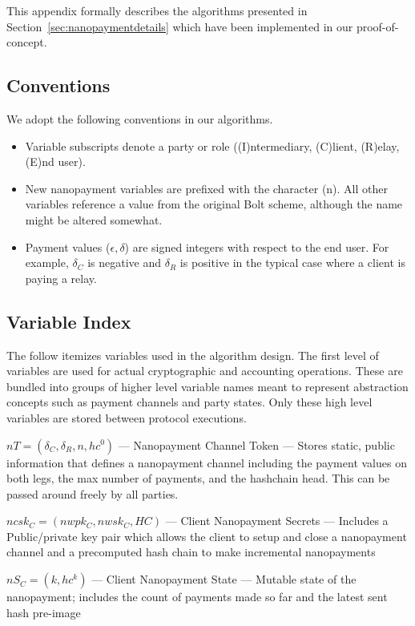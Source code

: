 This appendix formally describes the algorithms presented in Section~\ref{sec:nanopaymentdetails} which have been implemented in our proof-of-concept. 

\subsection{Conventions}

We adopt the following conventions in our algorithms.

\begin{itemize}
\item Variable subscripts denote a party or role ((I)ntermediary, (C)lient, (R)elay, (E)nd user).
\item New nanopayment variables are prefixed with the character (n).
  All other variables reference a value from the original Bolt scheme, although the name might be altered somewhat.
\item Payment values ($\epsilon, \delta$) are signed integers with respect to the end user.
  For example, $\delta_C$ is negative and $\delta_R$ is positive in the typical case where a client is paying a relay.
\end{itemize}

\subsection{Variable Index}

The follow itemizes variables used in the algorithm design.
The first level of variables are used for actual cryptographic and accounting operations.
These are bundled into groups of higher level variable names meant to represent abstraction concepts such as payment channels and party states.
Only these high level variables are stored between protocol executions.

$nT = (\delta_C, \delta_R, n, hc^0)$ --- Nanopayment Channel Token --- Stores static, public information that defines a nanopayment channel including the payment values on both legs, the max number of payments, and the hashchain head.
This can be passed around freely by all parties.

$ncsk_C = (nwpk_C, nwsk_C, HC)$ --- Client Nanopayment Secrets --- Includes a Public/private key pair which allows the client to setup and close a nanopayment channel and a precomputed hash chain to make incremental nanopayments

$nS_C = (k, hc^k)$ --- Client Nanopayment State --- Mutable state of the nanopayment; includes the count of payments made so far and the latest sent hash pre-image

